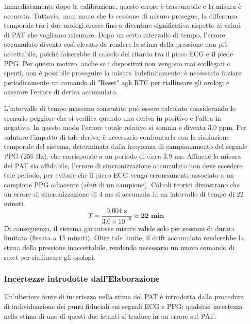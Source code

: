 \documentclass[11pt,a4paper]{article}
\begin{document}
Immediatamente dopo la calibrazione, questo errore è trascurabile e la misura è accurata. Tuttavia, man mano che la sessione di misura prosegue, la differenza temporale tra i due orologi cresce fino a diventare significativa rispetto ai valori di PAT che vogliamo misurare. Dopo un certo intervallo di tempo, l'errore accumulato diventa così elevato da rendere la stima della pressione non più accettabile, poiché falserebbe il calcolo del ritardo tra il picco ECG e il piede PPG. Per questo motivo, anche se i dispositivi non vengono mai scollegati o spenti, non è possibile proseguire la misura indefinitamente: è necessario inviare periodicamente un comando di "Reset" agli RTC per riallineare gli orologi e azzerare l'errore di deriva accumulato.

L’intervallo di tempo massimo consentito può essere calcolato considerando lo scenario peggiore che si verifica quando una deriva in positivo e l'altra in negativo. In questo modo l’errore totale relativo si somma e diventa 3.0 ppm. Per valutare l'impatto di tale deriva, è necessario confrontarla con la risoluzione temporale del sistema, determinata dalla frequenza di campionamento del segnale PPG (256 Hz), che corrisponde a un periodo di circa 3.9 ms. Affinché la misura del PAT sia affidabile, l'errore di sincronizzazione accumulato non deve eccedere tale periodo, per evitare che il picco ECG venga erroneamente associato a un campione PPG adiacente (\textit{shift} di un campione). Calcoli teorici dimostrano che un errore di sincronizzazione di 4 ms si accumula in un intervallo di tempo di 22 minuti. 
\begin{equation}
    T = \frac{0.004 \text{ s}}{3.0 \times 10^{-6}} \approx \mathbf{22 \text{ min}}
\end{equation}
Di conseguenza, il sistema garantisce misure valide solo per sessioni di durata limitata (fissata a 15 minuti). Oltre tale limite, il drift accumulato renderebbe la stima della pressione inaccettabile, rendendo necessario un nuovo comando di reset per riallineare gli orologi.

\subsubsection{Incertezze introdotte dall'Elaborazione}
Un’ulteriore fonte di incertezza nella stima del PAT è introdotta dalla procedura di individuazione dei punti fiduciali sui segnali ECG e PPG: qualsiasi incertezza nella stima di uno di questi due istanti si traduce in un errore sul PAT.
\end{document}
